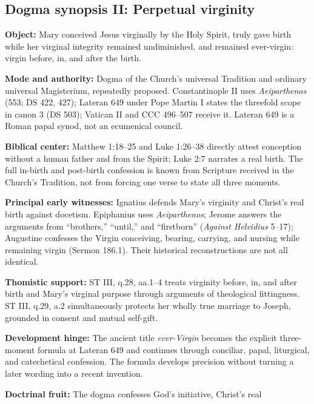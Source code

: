 \clearpage
\subsection*{Dogma synopsis II: Perpetual virginity}

\begingroup
\small
\begin{studyframe}
\textbf{Object:} Mary conceived Jesus virginally by the Holy Spirit, truly
gave birth while her virginal integrity remained undiminished, and remained
ever-virgin: virgin before, in, and after the birth.\par
\textbf{Mode and authority:} Dogma of the Church's universal Tradition and
ordinary universal Magisterium, repeatedly proposed.  Constantinople II uses
\emph{Aeiparthenos} (553; DS 422, 427); Lateran 649 under Pope Martin I states
the threefold scope in canon 3 (DS 503); Vatican II and CCC 496--507 receive
it.  Lateran 649 is a Roman papal synod, not an ecumenical council.\par
\textbf{Biblical center:} Matthew 1:18--25 and Luke 1:26--38 directly attest
conception without a human father and from the Spirit; Luke 2:7 narrates a
real birth.  The full in-birth and post-birth confession is known from
Scripture received in the Church's Tradition, not from forcing one verse to
state all three moments.\par
\textbf{Principal early witnesses:} Ignatius defends Mary's virginity and
Christ's real birth against docetism.  Epiphanius uses \emph{Aeiparthenos};
Jerome answers the arguments from ``brothers,'' ``until,'' and ``firstborn''
(\emph{Against Helvidius} 5--17); Augustine confesses the Virgin conceiving,
bearing, carrying, and nursing while remaining virgin (Sermon 186.1).  Their
historical reconstructions are not all identical.\par
\textbf{Thomistic support:} ST III, q.28, aa.1--4 treats virginity before, in,
and after birth and Mary's virginal purpose through arguments of theological
fittingness.  ST III, q.29, a.2 simultaneously protects her wholly true
marriage to Joseph, grounded in consent and mutual self-gift.\par
\textbf{Development hinge:} The ancient title \emph{ever-Virgin} becomes the
explicit three-moment formula at Lateran 649 and continues through conciliar,
papal, liturgical, and catechetical confession.  The formula develops
precision without turning a later wording into a recent invention.\par
\textbf{Doctrinal fruit:} The dogma confesses God's initiative, Christ's real

\end{studyframe}
